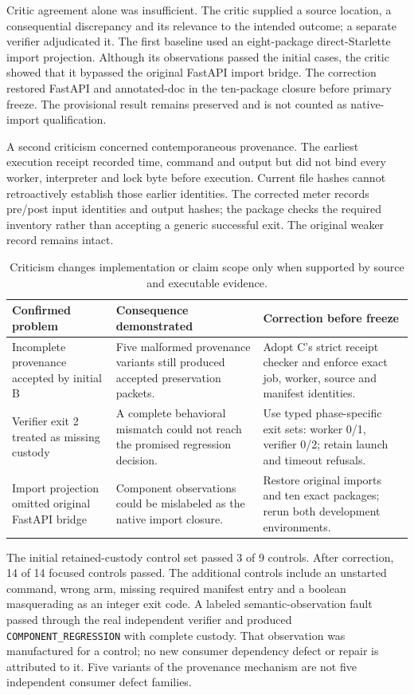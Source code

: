 \documentclass[11pt,a4paper]{article}
\newcommand{\Regression}{\texttt{COMPONENT\_REGRESSION}}
\begin{document}
Critic agreement alone was insufficient. The critic supplied a source location, a consequential discrepancy and its relevance to the intended outcome; a separate verifier adjudicated it. The first baseline used an eight-package direct-Starlette import projection. Although its observations passed the initial cases, the critic showed that it bypassed the original FastAPI import bridge. The correction restored FastAPI and annotated-doc in the ten-package closure before primary freeze. The provisional result remains preserved and is not counted as native-import qualification.\cite{criticism,firstdelivery}

A second criticism concerned contemporaneous provenance. The earliest execution receipt recorded time, command and output but did not bind every worker, interpreter and lock byte before execution. Current file hashes cannot retroactively establish those earlier identities. The corrected meter records pre/post input identities and output hashes; the package checks the required inventory rather than accepting a generic successful exit. The original weaker record remains intact.\cite{criticism}

\begin{table}[htbp]
\centering\small
\begin{tabularx}{\textwidth}{@{}p{}YY@{}}
\toprule
Confirmed problem & Consequence demonstrated & Correction before freeze \\
\midrule
Incomplete provenance accepted by initial B & Five malformed provenance variants still produced accepted preservation packets. & Adopt C's strict receipt checker and enforce exact job, worker, source and manifest identities. \\
Verifier exit 2 treated as missing custody & A complete behavioral mismatch could not reach the promised regression decision. & Use typed phase-specific exit sets: worker 0/1, verifier 0/2; retain launch and timeout refusals. \\
Import projection omitted original FastAPI bridge & Component observations could be mislabeled as the native import closure. & Restore original imports and ten exact packages; rerun both development environments. \\
\bottomrule
\end{tabularx}
\caption{Criticism changes implementation or claim scope only when supported by source and executable evidence.}
\label{tab:criticism}
\end{table}

The initial retained-custody control set passed 3 of 9 controls. After correction, 14 of 14 focused controls passed. The additional controls include an unstarted command, wrong arm, missing required manifest entry and a boolean masquerading as an integer exit code. A labeled semantic-observation fault passed through the real independent verifier and produced \Regression{} with complete custody. That observation was manufactured for a control; no new consumer dependency defect or repair is attributed to it. Five variants of the provenance mechanism are not five independent consumer defect families.\cite{controls}
\end{document}
